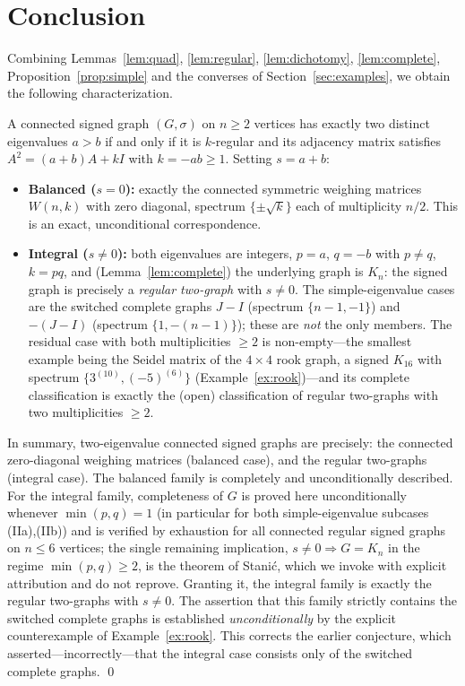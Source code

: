 \documentclass{amsart}
\theoremstyle{definition}
\begin{document}
\section{Conclusion}\label{sec:conclusion}

Combining Lemmas~\ref{lem:quad}, \ref{lem:regular}, \ref{lem:dichotomy},
\ref{lem:complete}, Proposition~\ref{prop:simple} and the converses of
Section~\ref{sec:examples}, we obtain the following characterization.

A connected signed graph $(G,\sigma)$ on $n\ge2$ vertices has exactly two
distinct eigenvalues $a>b$ if and only if it is $k$-regular and its adjacency
matrix satisfies $A^2=(a+b)A+kI$ with $k=-ab\ge1$. Setting $s=a+b$:
\begin{itemize}
\item \textbf{Balanced ($s=0$):} exactly the connected symmetric weighing
matrices $W(n,k)$ with zero diagonal, spectrum $\{\pm\sqrt k\}$ each of
multiplicity $n/2$. This is an exact, unconditional correspondence.
\item \textbf{Integral ($s\ne0$):} both eigenvalues are integers, $p=a$,
$q=-b$ with $p\ne q$, $k=pq$, and (Lemma~\ref{lem:complete}) the underlying
graph is $K_n$: the signed graph is precisely a \emph{regular two-graph} with
$s\ne0$. The simple-eigenvalue cases are the switched complete graphs
$J-I$ (spectrum $\{n-1,-1\}$) and $-(J-I)$ (spectrum $\{1,-(n-1)\}$); these are
\emph{not} the only members. The residual case with both multiplicities $\ge2$
is non-empty---the smallest example being the Seidel matrix of the $4\times4$
rook graph, a signed $K_{16}$ with spectrum $\{3^{(10)},(-5)^{(6)}\}$
(Example~\ref{ex:rook})---and its complete classification is exactly the
(open) classification of regular two-graphs with two multiplicities $\ge2$.
\end{itemize}

In summary, two-eigenvalue connected signed graphs are precisely: the
connected zero-diagonal weighing matrices (balanced case), and the regular
two-graphs (integral case). The balanced family is completely and
unconditionally described. For the integral family, completeness of $G$ is
proved here unconditionally whenever $\min(p,q)=1$ (in particular for both
simple-eigenvalue subcases (IIa),(IIb)) and is verified by exhaustion for all
connected regular signed graphs on $n\le6$ vertices; the single remaining
implication, $s\ne0\Rightarrow G=K_n$ in the regime $\min(p,q)\ge2$, is the
theorem of Stani\'c, which we invoke with explicit attribution and do not
reprove. Granting it, the integral family is exactly the regular two-graphs
with $s\ne0$. The assertion that this family strictly contains the switched
complete graphs is established \emph{unconditionally} by the explicit
counterexample of Example~\ref{ex:rook}. This corrects the earlier conjecture, which
asserted---incorrectly---that the integral case consists only of the switched
complete graphs.
\qed
\end{document}
